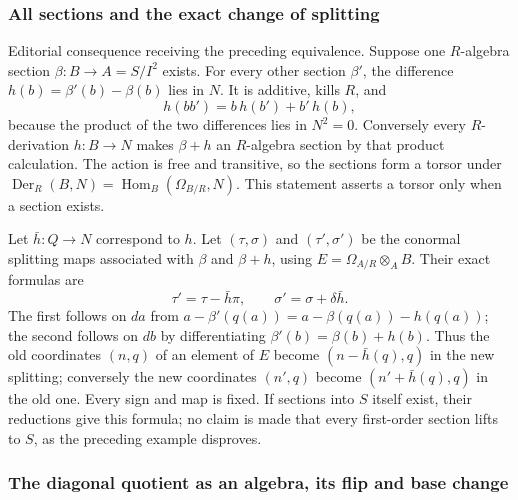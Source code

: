 \subsubsection{All sections and the exact change of splitting}\label{all-sections-and-the-exact-change-of-splitting}

Editorial consequence receiving the preceding equivalence. Suppose one \(R\)-algebra section \(\beta:B\to A=S/I^2\) exists. For every other section \(\beta'\), the difference \(h(b)=\beta'(b)-\beta(b)\) lies in \(N\). It is additive, kills \(R\), and \[
h(bb')=b\,h(b')+b'\,h(b),
\] because the product of the two differences lies in \(N^2=0\). Conversely every \(R\)-derivation \(h:B\to N\) makes \(\beta+h\) an \(R\)-algebra section by that product calculation. The action is free and transitive, so the sections form a torsor under \(\operatorname{Der}_R(B,N)=\operatorname{Hom}_B(\Omega_{B/R},N)\). This statement asserts a torsor only when a section exists.

Let \(\bar h:Q\to N\) correspond to \(h\). Let \((\tau,\sigma)\) and \((\tau',\sigma')\) be the conormal splitting maps associated with \(\beta\) and \(\beta+h\), using \(E=\Omega_{A/R}\otimes_A B\). Their exact formulas are \[
\tau'=\tau-\bar h\pi,\qquad
\sigma'=\sigma+\delta\bar h.
\] The first follows on \(da\) from \(a-\beta'(q(a))=a-\beta(q(a))-h(q(a))\); the second follows on \(db\) by differentiating \(\beta'(b)=\beta(b)+h(b)\). Thus the old coordinates \((n,q)\) of an element of \(E\) become \((n-\bar h(q),q)\) in the new splitting; conversely the new coordinates \((n',q)\) become \((n'+\bar h(q),q)\) in the old one. Every sign and map is fixed. If sections into \(S\) itself exist, their reductions give this formula; no claim is made that every first-order section lifts to \(S\), as the preceding example disproves.

\subsubsection{The diagonal quotient as an algebra, its flip and base change}\label{the-diagonal-quotient-as-an-algebra-its-flip-and-base-change}


